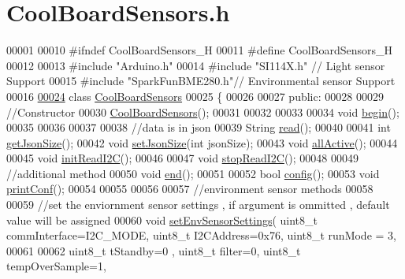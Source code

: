 \hypertarget{_cool_board_sensors_8h_source}{}\section{Cool\+Board\+Sensors.\+h}

\begin{DoxyCode}
00001 
00010 \textcolor{preprocessor}{#ifndef CoolBoardSensors\_H}
00011 \textcolor{preprocessor}{#define CoolBoardSensors\_H}
00012 
00013 \textcolor{preprocessor}{#include "Arduino.h"}
00014 \textcolor{preprocessor}{#include "SI114X.h"}        \textcolor{comment}{// Light sensor Support}
00015 \textcolor{preprocessor}{#include "SparkFunBME280.h"}\textcolor{comment}{// Environmental sensor Support}
00016 
\hyperlink{class_cool_board_sensors}{00024} \textcolor{keyword}{class }\hyperlink{class_cool_board_sensors}{CoolBoardSensors}
00025 \{
00026 
00027 \textcolor{keyword}{public}:
00028 
00029     \textcolor{comment}{//Constructor}
00030     \hyperlink{class_cool_board_sensors_a91ff2a02f5486f90cf2413a1cf8a9ed4}{CoolBoardSensors}();
00031 
00032 
00033 
00034     \textcolor{keywordtype}{void} \hyperlink{class_cool_board_sensors_a97095823ef7c8f5290812f1405b966b3}{begin}();
00035 
00036 
00037 
00038     \textcolor{comment}{//data is in json}
00039     String \hyperlink{class_cool_board_sensors_a91badb2539d91fda8679f2a597874c48}{read}();
00040 
00041     \textcolor{keywordtype}{int} \hyperlink{class_cool_board_sensors_ab82c2a1633768ccd12a589320fa31a14}{getJsonSize}();
00042     \textcolor{keywordtype}{void} \hyperlink{class_cool_board_sensors_ab76e6dbd6efbcc25ff460535badd8d45}{setJsonSize}(\textcolor{keywordtype}{int} jsonSize);
00043     \textcolor{keywordtype}{void} \hyperlink{class_cool_board_sensors_aa432c5aac88f89c31a10766390f23e0b}{allActive}();
00044 
00045     \textcolor{keywordtype}{void} \hyperlink{class_cool_board_sensors_acad6a8418c66d36868caca23c844ecb6}{initReadI2C}();
00046 
00047     \textcolor{keywordtype}{void} \hyperlink{class_cool_board_sensors_ab67b900b9e5e7c18d52d2d9107ba171b}{stopReadI2C}();
00048 
00049     \textcolor{comment}{//additional method}
00050     \textcolor{keywordtype}{void} \hyperlink{class_cool_board_sensors_a4902b69f6e628bd6557193758fdd2bae}{end}();
00051 
00052     \textcolor{keywordtype}{bool} \hyperlink{class_cool_board_sensors_a9a218895c5423375c33c08f2c56fb23a}{config}();
00053     \textcolor{keywordtype}{void} \hyperlink{class_cool_board_sensors_af6fd79505815b204c178617ecf54c873}{printConf}();
00054 
00055 
00056 
00057     \textcolor{comment}{//environment sensor methods}
00058 
00059     \textcolor{comment}{//set the enviornment sensor settings , if argument is ommitted , default value will be assigned}
00060     \textcolor{keywordtype}{void} \hyperlink{class_cool_board_sensors_a406307ffd70272282d91479c7ed8d66f}{setEnvSensorSettings}( uint8\_t commInterface=I2C\_MODE, uint8\_t I2CAddress=0x76,
          uint8\_t runMode = 3,
00061                        
00062                    uint8\_t tStandby=0   , uint8\_t filter=0,    uint8\_t tempOverSample=1,                   
                                  

\end{DoxyCode}
